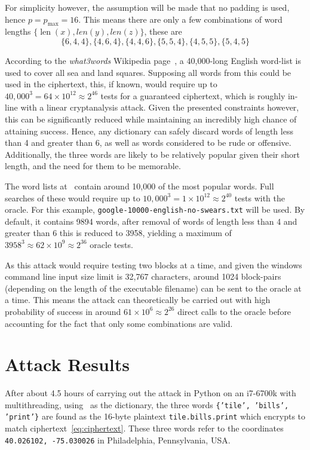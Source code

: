 \documentclass[11pt]{article}
\DeclareMathOperator{\len}{len}
\begin{document}
\begin{multicols*}{2}
        For simplicity however, the assumption will be made that no padding is used, hence $p = p_{\max} = 16$.
        This means there are only a few combinations of word lengths $\{\len(x), len(y), len(z)\}$, these are
        \[\{6, 4, 4\}, \{4, 6, 4\}, \{4, 4, 6\}, \{5, 5, 4\}, \{4, 5, 5\}, \{5, 4, 5\}\]

        According to the \textit{what3words} Wikipedia page~\cite{what3words_wikipedia}, a 40,000-long English word-list is used to cover all sea and land squares.
        Supposing all words from this could be used in the ciphertext, this, if known, would require up to $40,000^3 = 64\times 10^{12} \approx 2^{46}$ tests for a guaranteed ciphertext, which is roughly in-line with a linear cryptanalysis attack.
        Given the presented constraints however, this can be significantly reduced while maintaining an incredibly high chance of attaining success.
        Hence, any dictionary can safely discard words of length less than 4 and greater than 6, as well as words considered to be rude or offensive.
        Additionally, the three words are likely to be relatively popular given their short length, and the need for them to be memorable.

        The word lists at~\cite{attack_dictionary} contain around 10,000 of the most popular words.
        Full searches of these would require up to $10,000^3 = 1\times 10^{12} \approx 2^{40}$ tests with the oracle.
        For this example, \texttt{google-10000-english-no-swears.txt} will be used.
        By default, it contains 9894 words, after removal of words of length less than 4 and greater than 6 this is reduced to 3958, yielding a maximum of $3958^3 \approx 62\times 10^{9} \approx 2^{36}$ oracle tests.

        As this attack would require testing two blocks at a time, and given the windows command line input size limit is 32,767 characters, around 1024 block-pairs (depending on the length of the executable filename) can be sent to the oracle at a time.
        This means the attack can theoretically be carried out with high probability of success in around $61 \times 10^6 \approx 2^{26}$ direct calls to the oracle before accounting for the fact that only some combinations are valid.


        \section{Attack Results}\label{sec:attack-results}
        After about 4.5 hours of carrying out the attack in Python on an i7-6700k with multithreading, using~\cite{attack_dictionary} as the dictionary, the three words \texttt{\{'tile', 'bills', 'print'\}} are found as the 16-byte plaintext \texttt{tile.bills.print} which encrypts to match ciphertext~\eqref{eq:ciphertext}.
        These three words refer to the coordinates \texttt{40.026102, -75.030026} in Philadelphia, Pennsylvania, USA\@.



\end{multicols*}
\end{document}
